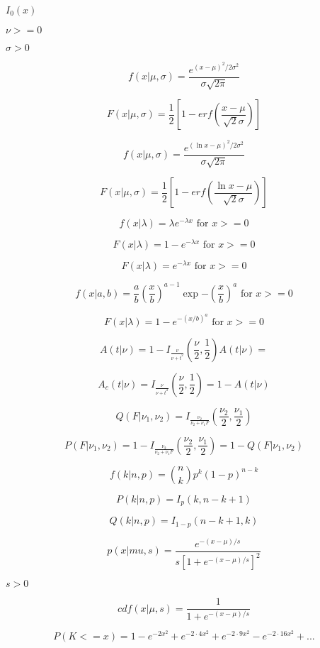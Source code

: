 \documentclass{article}
\begin{document}
$I_0(x)$
\pagebreak

$\nu >= 0$
\pagebreak

$\sigma > 0$
\pagebreak

\[ f(x|\mu,\sigma) = \frac{e^{(x-\mu)^2/2\sigma^2}}{\sigma\sqrt{2\pi}} \]
\pagebreak

\[ F(x|\mu,\sigma) = \frac{1}{2}\left[ 1-erf(\frac{x-\mu}{\sqrt{2}\sigma}) \right] \]
\pagebreak

\[ f(x|\mu,\sigma) = \frac{e^{(\ln{x}-\mu)^2/2\sigma^2}}{\sigma\sqrt{2\pi}} \]
\pagebreak

\[ F(x|\mu,\sigma) = \frac{1}{2}\left[ 1-erf(\frac{\ln{x}-\mu}{\sqrt{2}\sigma}) \right] \]
\pagebreak

\[ f(x|\lambda) = \lambda e^{-\lambda x} \mbox{ for } x >= 0 \]
\pagebreak

\[ F(x|\lambda) = 1 - e^{-\lambda x} \mbox{ for } x >= 0 \]
\pagebreak

\[ F(x|\lambda) = e^{-\lambda x} \mbox{ for } x >= 0 \]
\pagebreak

\[ f(x | a, b) = \frac{a}{b} \left(\frac{x}{b} \right)^{a-1} \exp{-\left(\frac{x}{b}\right)^a} \mbox{ for } x >= 0 \]
\pagebreak

\[ F(x|\lambda) = 1 - e^{-(x / b)^a} \mbox{ for } x >= 0 \]
\pagebreak

\[ A(t|\nu) = 1 - I_{\frac{\nu}{\nu + t^2}}(\frac{\nu}{2}, \frac{1}{2}) A(t|\nu) = \]
\pagebreak

\[ A_c(t|\nu) = I_{\frac{\nu}{\nu + t^2}}(\frac{\nu}{2}, \frac{1}{2}) = 1 - A(t|\nu) \]
\pagebreak

\[ Q(F|\nu_1, \nu_2) = I_{\frac{\nu_2}{\nu_2 + \nu_1 F}} (\frac{\nu_2}{2}, \frac{\nu_1}{2}) \]
\pagebreak

\[ P(F|\nu_1, \nu_2) = 1 - I_{\frac{\nu_2}{\nu_2 + \nu_1 F}} (\frac{\nu_2}{2}, \frac{\nu_1}{2}) = 1 - Q(F|\nu_1, \nu_2) \]
\pagebreak

\[ f(k|n,p) = \binom{n}{k}p^k(1-p)^{n-k} \]
\pagebreak

\[ P(k|n,p) = I_p(k, n-k+1) \]
\pagebreak

\[ Q(k|n,p) = I_{1-p}(n-k+1, k) \]
\pagebreak

\[ p(x| mu, s) = \frac{e^{-(x - \mu)/s}}{s[1 + e^{-(x - \mu)/s}]^2} \]
\pagebreak

$s > 0$
\pagebreak

\[ cdf(x| \mu, s) = \frac{1}{1 + e^{-(x - \mu)/s}} \]
\pagebreak

\[ P(K <= x) = 1 - e^{-2x^2} + e^{-2 \cdot 4 x^2} + e^{-2 \cdot 9 x^2} - e^{-2 \cdot 16 x^2} + ... \]
\pagebreak
\end{document}
